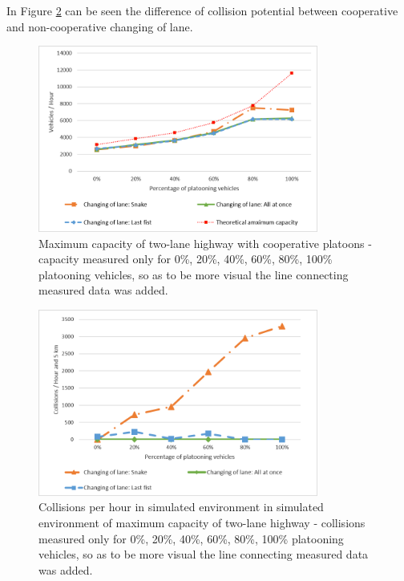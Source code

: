 In Figure \ref{fig:6_2_2-2} can be seen the difference of collision potential between cooperative and non-cooperative changing of lane.

\begin{figure}[!htbp]
\centering
\includegraphics[width=0.82\textwidth,height=0.82\textheight,keepaspectratio]{figures/Chapter_6/6_E1_maxCap.png}
\centering
\protect\caption[Maximum capacity of two-lane highway with cooperate platoons]{\label{fig:6_2_2-1}Maximum capacity of two-lane highway with cooperative platoons - capacity measured only for 0\%, 20\%, 40\%, 60\%, 80\%, 100\% platooning vehicles, so as to be more visual the line connecting measured data was added.}
\end{figure}

\begin{figure}[!htbp]
\centering
\includegraphics[width=0.82\textwidth,height=0.82\textheight,keepaspectratio]{figures/Chapter_6/6_E1_collision.png}
\centering
\protect\caption[Collisions per hour in simulated environment in simulated environment of maximum capacity of two-lane highway]{\label{fig:6_2_2-2}Collisions per hour in simulated environment in simulated environment of maximum capacity of two-lane highway - collisions measured only for 0\%, 20\%, 40\%, 60\%, 80\%, 100\% platooning vehicles, so as to be more visual the line connecting measured data was added.}
\end{figure}










